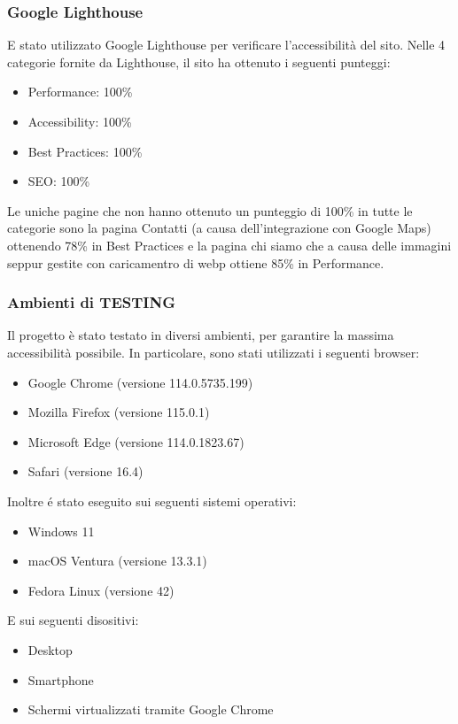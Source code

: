 \subsubsection{Google Lighthouse}

E stato utilizzato Google Lighthouse per verificare l'accessibilità del sito. Nelle 4 categorie fornite da Lighthouse, il sito ha ottenuto i seguenti punteggi:
\begin{itemize}
  \item Performance: 100\%
  \item Accessibility: 100\%
  \item Best Practices: 100\%
  \item SEO: 100\%
\end{itemize}

Le uniche pagine che non hanno ottenuto un punteggio di 100\% in tutte le categorie sono la pagina Contatti (a causa dell'integrazione con Google Maps) ottenendo 78\% in Best Practices e la pagina chi siamo che a causa delle immagini seppur gestite con caricamentro di webp ottiene 85\% in Performance.

\subsubsection{Ambienti di TESTING}

Il progetto è stato testato in diversi ambienti, per garantire la massima accessibilità possibile. In particolare, sono stati utilizzati i seguenti browser:

\begin{itemize}
  \item Google Chrome (versione 114.0.5735.199)
  \item Mozilla Firefox (versione 115.0.1)
  \item Microsoft Edge (versione 114.0.1823.67)
  \item Safari (versione 16.4)
\end{itemize}

Inoltre é stato eseguito sui seguenti sistemi operativi:
\begin{itemize}
  \item Windows 11
  \item macOS Ventura (versione 13.3.1)
  \item Fedora Linux (versione 42)
\end{itemize}

E sui seguenti disositivi:
\begin{itemize}
  \item Desktop
  \item Smartphone
  \item Schermi virtualizzati tramite Google Chrome
\end{itemize}